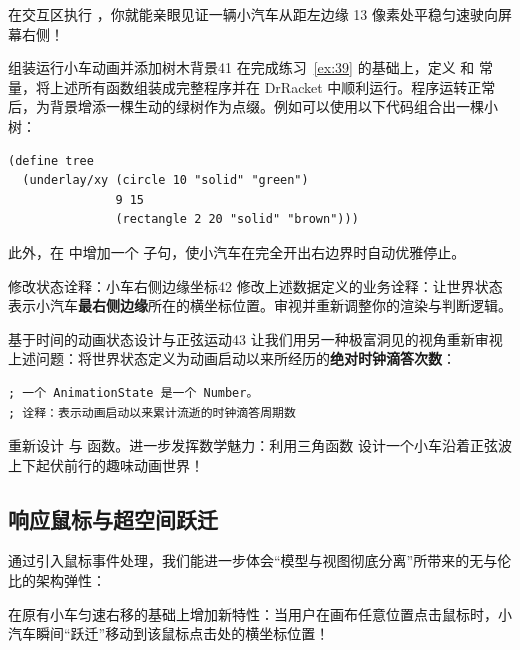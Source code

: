 在交互区执行 ，你就能亲眼见证一辆小汽车从距左边缘 13 像素处平稳匀速驶向屏幕右侧！

\begin{exercise}{组装运行小车动画并添加树木背景}{41}
在完成练习~\ref{ex:39} 的基础上，定义  和  常量，将上述所有函数组装成完整程序并在 DrRacket 中顺利运行。程序运转正常后，为背景增添一棵生动的绿树作为点缀。例如可以使用以下代码组合出一棵小树：
\begin{lstlisting}[language=BSL]
(define tree
  (underlay/xy (circle 10 "solid" "green")
               9 15
               (rectangle 2 20 "solid" "brown")))
\end{lstlisting}
此外，在  中增加一个  子句，使小汽车在完全开出右边界时自动优雅停止。
\end{exercise}

\begin{exercise}{修改状态诠释：小车右侧边缘坐标}{42}
修改上述数据定义的业务诠释：让世界状态  表示小汽车\textbf{最右侧边缘}所在的横坐标位置。审视并重新调整你的渲染与判断逻辑。
\end{exercise}

\begin{exercise}{基于时间的动画状态设计与正弦运动}{43}
让我们用另一种极富洞见的视角重新审视上述问题：将世界状态定义为动画启动以来所经历的\textbf{绝对时钟滴答次数}：
\begin{lstlisting}[language=BSL]
; 一个 AnimationState 是一个 Number。
; 诠释：表示动画启动以来累计流逝的时钟滴答周期数
\end{lstlisting}
重新设计  与  函数。进一步发挥数学魅力：利用三角函数  设计一个小车沿着正弦波上下起伏前行的趣味动画世界！
\end{exercise}

\subsection{响应鼠标与超空间跃迁}

通过引入鼠标事件处理，我们能进一步体会“模型与视图彻底分离”所带来的无与伦比的架构弹性：
\begin{notebox}
在原有小车匀速右移的基础上增加新特性：当用户在画布任意位置点击鼠标时，小汽车瞬间“跃迁”移动到该鼠标点击处的横坐标位置！
\end{notebox}

